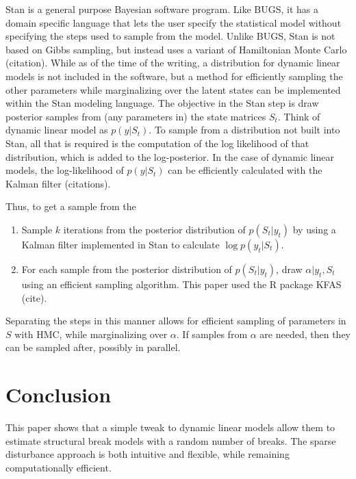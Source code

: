 \documentclass{article}
\begin{document}
Stan is a general purpose Bayesian software program.
Like BUGS, it has a domain specific language that lets the user specify the statistical model without specifying the steps used to sample from the model.
Unlike BUGS, Stan is not based on Gibbs sampling, but instead uses a variant of Hamiltonian Monte Carlo (citation).
While as of the time of the writing, a distribution for dynamic linear models is not included in the software, but a method for efficiently sampling the other parameters while marginalizing over the latent states can be implemented within the Stan modeling language.
The objective in the Stan step is draw posterior samples from (any parameters in) the state matrices $S_{t}$.
Think of dynamic linear model as  $p(y | S_{t})$. 
To sample from a distribution not built into Stan, all that is required is the computation of the log likelihood of that distribution, which is added to the log-posterior.
In the case of dynamic linear models, the log-likelihood of $p(y | S_{t})$ can be efficiently calculated with the Kalman filter (citations).

Thus, to get a sample from the
\begin{enumerate}
\item Sample $k$ iterations from the posterior distribution of $p(S_{t} | y_{t})$ by using a Kalman filter implemented in Stan to calculate $\log p(y_{t} | S_{t})$.
\item For each sample from the posterior distribution of $p(S_{t} | y_{t})$, draw $\alpha | y_{t}, S_{t}$ using an efficient sampling algorithm.
This paper used the R package KFAS (cite).
\end{enumerate}

Separating the steps in this manner allows for efficient sampling of parameters in $S$ with HMC, while marginalizing over $\alpha$.
If samples from $\alpha$ are needed, then they can be sampled after, possibly in parallel.


\section{Conclusion}
\label{sec:conclusion}

This paper shows that a simple tweak to dynamic linear models allow them to estimate structural break models with a random number of breaks.
The sparse disturbance approach is both intuitive and flexible, while remaining computationally efficient.

\clearpage{}

\printbibliography{}
\end{document}
